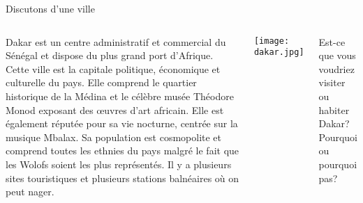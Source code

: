 \begin{frame}{Discutons d'une ville}
  \vspace{0.25cm}
  \begin{columns}
    \small
      Dakar est un centre administratif et commercial du Sénégal et dispose du plus grand port d'Afrique.
      Cette ville est la capitale politique, économique et culturelle du pays.
      Elle comprend le quartier historique de la Médina et le célèbre musée Théodore Monod exposant des œuvres d'art africain.
      Elle est également réputée pour sa vie nocturne, centrée sur la musique Mbalax.
      Sa population est cosmopolite et comprend toutes les ethnies du pays malgré le fait que les Wolofs soient les plus représentés.
      Il y a plusieurs sites touristiques et plusieurs stations balnéaires où on peut nager.
      \begin{center}
        \texttt{[image: dakar.jpg]}
      \end{center}
      Est-ce que vous voudriez visiter ou habiter Dakar?
      Pourquoi ou pourquoi pas?
  \end{columns}
\end{frame}